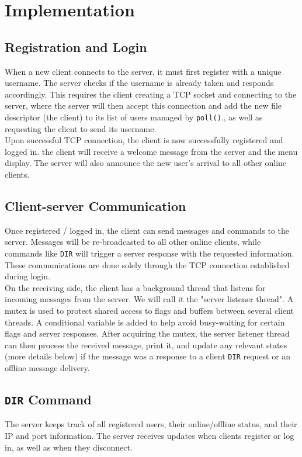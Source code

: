 \documentclass[11pt]{article}
\begin{document}
\section{Implementation}

\subsection{Registration and Login}
When a new client connects to the server, it must first register with a unique username. 
The server checks if the username is already taken and responds accordingly. 
This requires the client creating a TCP socket and connecting to the server, 
where the server will then accept this connection and 
add the new file descriptor (the client) to its list of users managed by \texttt{poll()}., 
as well as requesting the client to send its username. \\

Upon successful TCP connection, the client is now successfully registered and logged in.
the client will receive a welcome message from the server and the menu display.
The server will also announce the new user's arrival to all other online clients.

\subsection{Client-server Communication}
Once registered / logged in, the client can send messages and commands to the server. 
Messages will be re-broadcasted to all other online clients, 
while commands like \texttt{DIR} will trigger a server response with the requested information.
These communications are done solely through the TCP connection established during login. \\

On the receiving side, the client has a background thread that listens for incoming messages from the server. 
We will call it the "server listener thread". 
A mutex is used to protect shared access to flags and buffers between several client threads.
A conditional variable is added to help avoid busy-waiting for certain flags and server responses.
After acquiring the mutex, the server listener thread can then process the received message, print it, 
and update any relevant states (more details below) 
if the message was a response to a client \texttt{DIR} request or an offline message delivery. 

\subsection{\texttt{DIR} Command}
The server keeps track of all registered users, 
their online/offline status, and their IP and port information.
The server receives updates when clients register or log in, as well as when they disconnect. \\
\end{document}
